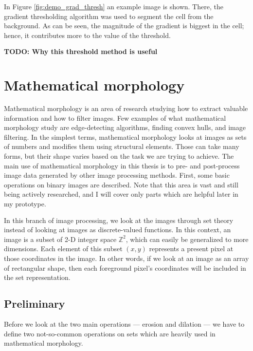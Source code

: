 \documentclass[
  digital,     %
  oneside,     %
  nosansbold,  %
  nocolorbold, %
  lof,         %
  lot,         %
]{fithesis4}
\newcommand*{\Z}{\ensuremath{\mathbb{Z}}}
\begin{document}
In Figure \ref{fig:demo_grad_thresh} an example image is shown. There, the
gradient thresholding algorithm was used to segment the cell from the
background. As can be seen, the magnitude of the gradient is biggest in the
cell; hence, it contributes more to the value of the threshold.

\textbf{TODO: Why this threshold method is useful}

\section{Mathematical morphology}

Mathematical morphology is an area of research studying how to extract valuable
information and how to filter images. Few examples of what mathematical
morphology study are edge-detecting algorithms, finding convex hulls, and image
filtering. In the simplest terms, mathematical morphology looks at images as
sets of numbers and modifies them using structural elements. Those can take many
forms, but their shape varies based on the task we are trying to achieve. The
main use of mathematical morphology in this thesis is to pre- and post-process
image data generated by other image processing methods. First, some basic
operations on binary images are described. Note that this area is vast and still
being actively researched, and I will cover only parts which are helpful later
in my prototype.

In this branch of image processing, we look at the images through set theory
instead of looking at images as discrete-valued functions. In this context, an
image is a subset of 2-D integer space $\Z^2$, which can easily be generalized
to more dimensions. Each element of this subset $(x, y)$ represents a present
pixel at those coordinates in the image. In other words, if we look at an image
as an array of rectangular shape, then each foreground pixel's coordinates will
be included in the set representation.

\subsection{Preliminary}
Before we look at the two main operations --- erosion and dilation --- we have to
define two not-so-common operations on sets which are heavily used in
mathematical morphology.
\end{document}
